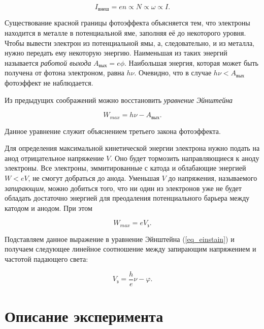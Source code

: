 \documentclass[12pt]{article}
\begin{document}
	\begin{equation}\label{eq:1}
	 	I_\text{внеш} = en \propto N \propto \omega \propto I. 
	\end{equation} 

	\par Существование красной границы фотоэффекта объясняется тем, что электроны находится в металле в потенциальной яме, заполняя её до некоторого уровня. Чтобы вывести электрон из потенциальной ямы, а, следовательно, и из металла, нужно передать ему некоторую энергию. Наименьшая из таких энергий называется \emph{работой выхода} $A_{\text{вых}} =e\phi$.	Наибольшая энергия, которая может быть получена от фотона электроном, равна $h\nu$. Очевидно, что в случае $h\nu < A_{\text{вых}}$ фотоэффект не наблюдается.

	\par Из предыдущих соображений можно восстановить \emph{уравнение Эйнштейна}

	\begin{equation}\label{eq_einstain}
		W_{max} = h\nu - A_{\text{вых}}.
	\end{equation}

	Данное уравнение служит объяснением третьего закона фотоэффекта. 

	\par Для определения максимальной кинетической энергии электрона нужно подать на анод отрицательное напряжение $V$. Оно будет тормозить направляющиеся к аноду электроны. Все электроны, эммитированные с катода и облабающие энергией $W < eV$, не смогут добраться до анода. Уменьшая $V$ до напряжения, называемого \emph{запирающим}, можно добиться того, что ни один из электронов уже не будет обладать достаточно энергией для преодаления потенциального барьера между катодом и анодом. При этом 

	\begin{equation}
	 	W_{max} = e V_{\text{з}}.
	\end{equation} 

	Подставляем данное выражение в уравнение Эйнштейна (\ref{eq_einstain}) и получаем следующее линейное соотношение между запирающим напряжением и частотой падающего света:

	\begin{equation}
		V_{\text{з}} = \dfrac{h}{e}\nu - \varphi.
	\end{equation}

	\section{Описание эксперимента} %
	\label{sec:exp_review}
	
\end{document}
